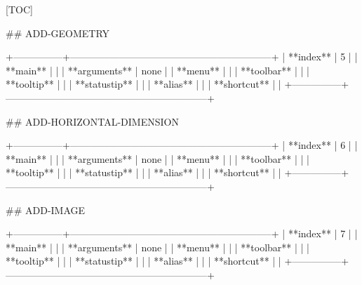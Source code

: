 [TOC]

## ADD-GEOMETRY

+---------------+--------------------------------------------------------------+
| **index**     | 5                                                            |
| **main**      |                                                              |
| **arguments** | none                                                         |
| **menu**      |                                                              |
| **toolbar**   |                                                              |
| **tooltip**   |                                                              |
| **statustip** |                                                              |
| **alias**     |                                                              |
| **shortcut**  |                                                              |
+---------------+--------------------------------------------------------------+

## ADD-HORIZONTAL-DIMENSION

+---------------+--------------------------------------------------------------+
| **index**     | 6                                                            |
| **main**      |                                                              |
| **arguments** | none                                                         |
| **menu**      |                                                              |
| **toolbar**   |                                                              |
| **tooltip**   |                                                              |
| **statustip** |                                                              |
| **alias**     |                                                              |
| **shortcut**  |                                                              |
+---------------+--------------------------------------------------------------+


## ADD-IMAGE

+---------------+--------------------------------------------------------------+
| **index**     | 7                                                            |
| **main**      |                                                              |
| **arguments** | none                                                         |
| **menu**      |                                                              |
| **toolbar**   |                                                              |
| **tooltip**   |                                                              |
| **statustip** |                                                              |
| **alias**     |                                                              |
| **shortcut**  |                                                              |
+---------------+--------------------------------------------------------------+

